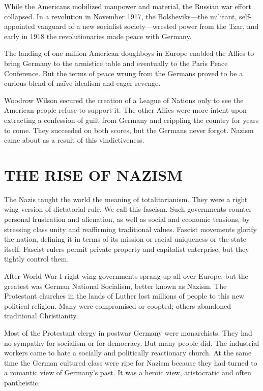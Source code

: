 While the Americans mobilized manpower and material, the Russian war effort collapsed. In a
revolution in November 1917, the Bolsheviks—the militant, self-appointed vanguard of a new socialist
society—wrested power from the Tzar, and early in 1918 the revolutionaries made peace with Germany.

The landing of one million American doughboys in Europe enabled the Allies to bring Germany to the
armistice table and eventually to the Paris Peace Conference. But the terms of peace wrung from the
Germans proved to be a curious blend of naïve idealism and eager revenge.

Woodrow Wilson secured the creation of a League of Nations only to see the American people refuse to
support it. The other Allies were more intent upon extracting a confession of guilt from Germany and
crippling the country for years to come. They succeeded on both scores, but the Germans never
forgot. Nazism came about as a result of this vindictiveness.

\section{THE RISE OF NAZISM}

The Nazis taught the world the meaning of totalitarianism. They were a right wing version of
dictatorial rule. We call this fascism. Such governments counter personal frustration and
alienation, as well as social and economic tensions, by stressing class unity and reaffirming
traditional values. Fascist movements glorify the nation, defining it in terms of its mission or
racial uniqueness or the state itself. Fascist rulers permit private property and capitalist
enterprise, but they tightly control them.

After World War I right wing governments sprang up all over Europe, but the greatest was German
National Socialism, better known as Nazism. The Protestant churches in the lands of Luther lost
millions of people to this new political religion. Many were compromised or coopted; others
abandoned traditional Christianity.

Most of the Protestant clergy in postwar Germany were monarchists. They had no sympathy for
socialism or for democracy. But many people did. The industrial workers came to hate a socially and
politically reactionary church. At the same time the German cultured class were ripe for Nazism
because they had turned to a romantic view of Germany’s past. It was a heroic view, aristocratic and
often pantheistic.

